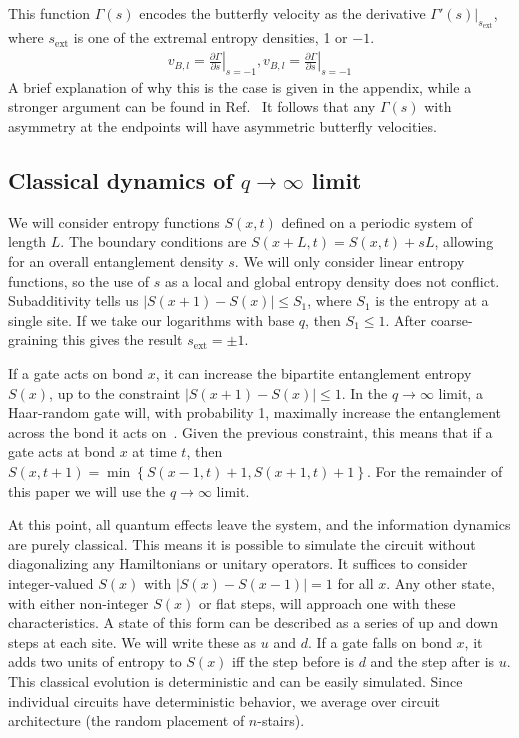 \documentclass[aps,prx,reprint,superscriptaddress, longbibliography]{revtex4-1}
\newcommand{\charlie}[1]{{\color{Magenta}{{#1}}}}
\begin{document}
This function $\Gamma(s)$ encodes the butterfly velocity as the derivative $\Gamma'(s)|_{s_\text{ext}}$, where $s_\text{ext}$ is one of the extremal entropy densities, 1 or $-1$. 
\begin{align}
v_{B,l}=\left.\frac{\partial \Gamma}{\partial s}\right|_{s=-1}, 
v_{B,l}=\left.\frac{\partial \Gamma}{\partial s}\right|_{s=-1} 
\label{eqn:vbGamma}
\end{align}
A brief explanation of why this is the case is given in the appendix, while a stronger argument can be found in Ref.~\cite{Jonay}
It follows that any $\Gamma(s)$ with asymmetry at the endpoints will have asymmetric butterfly velocities.

\subsection{Classical dynamics of $q\to\infty$ limit} \label{sub:classical}

We will consider entropy functions $S(x,t)$ defined on a periodic system of length $L$. The boundary conditions are $S(x+L,t) = S(x,t)+sL$, allowing for an overall entanglement density $s$. We will only consider linear entropy functions, so the use of $s$ as a local and global entropy density does not conflict.
Subadditivity tells us ${|S(x + 1)-S(x)|} \le S_1$, where $S_1$ is the entropy at a single site. If we take our logarithms with base $q$, then $S_1 \le 1$. After coarse-graining this gives the result $s_\text{ext}=\pm1$.

If a gate acts on bond $x$, it can increase the bipartite entanglement entropy $S(x)$, up to the constraint $|S(x + 1) - S(x)| \le 1$. In the $q\to\infty$ limit, a Haar-random gate will, with probability 1, maximally increase the entanglement across the bond it acts on~\cite{nahum2017quantum}. Given the previous constraint, this means that if a gate acts at bond $x$ at time $t$, then $S(x, t+1) = \min\left\lbrace S(x-1,t)+1, S(x+1,t)+1\right\rbrace$. \charlie{Should we explain why?} For the remainder of this paper we will use the $q\to\infty$ limit.

At this point, all quantum effects leave the system, and the information dynamics are purely classical. This means it is possible to simulate the circuit without diagonalizing any Hamiltonians or unitary operators. It suffices to consider integer-valued $S(x)$ with $|S(x)-S(x-1)|=1$ for all $x$. Any other state, with either non-integer $S(x)$ or flat steps, will approach one with these characteristics. A state of this form can be described as a series of up and down steps at each site. We will write these as $u$ and $d$. If a gate falls on bond $x$, it adds two units of entropy to $S(x)$ iff the step before is $d$ and the step after is $u$. This classical evolution is deterministic and can be easily simulated.
Since individual circuits have deterministic behavior, we average over circuit architecture (the random placement of $n$-stairs).
\end{document}
